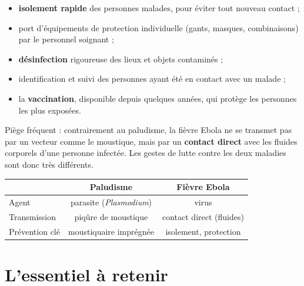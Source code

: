 \begin{propriete}
\begin{itemize}
\item \textbf{isolement rapide} des personnes malades, pour éviter tout nouveau
contact ;
\item port d'équipements de protection individuelle (gants, masques, combinaisons)
par le personnel soignant ;
\item \textbf{désinfection} rigoureuse des lieux et objets contaminés ;
\item identification et suivi des personnes ayant été en contact avec un malade ;
\item la \textbf{vaccination}, disponible depuis quelques années, qui protège les
personnes les plus exposées.
\end{itemize}
\end{propriete}

\begin{remarque}
Piège fréquent : contrairement au paludisme, la fièvre Ebola ne se transmet pas par
un vecteur comme le moustique, mais par un \textbf{contact direct} avec les fluides
corporels d'une personne infectée. Les gestes de lutte contre les deux maladies sont
donc très différents.
\end{remarque}

\begin{propriete}
\begin{center}
\small
\begin{tabular}{lcc}
\toprule
& \textbf{Paludisme} & \textbf{Fièvre Ebola} \\
\midrule
Agent & parasite (\textit{Plasmodium}) & virus \\
Transmission & piqûre de moustique & contact direct (fluides) \\
Prévention clé & moustiquaire imprégnée & isolement, protection \\
\bottomrule
\end{tabular}
\end{center}
\end{propriete}

\section{L'essentiel à retenir}

